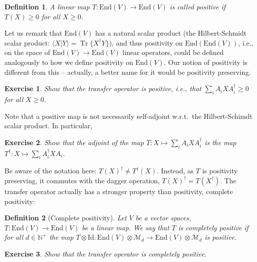 \documentclass{article}
\newtheorem{definition}{Definition}
\newtheorem{exercise}{Exercise}
\newcommand{\tr}{\operatorname{Tr}}
\newcommand{\id}{\mathrm{Id}}
\newcommand{\End}{\mathrm{End}}
\newcommand{\scalprod}[2]{\langle #1 \vert #2 \rangle}
\begin{document}
\begin{definition}  
   A linear map $T:\End(V)\to \End(V)$ is called positive if $T(X)\geq 0$ for all $X\geq 0$.  
\end{definition}
Let us remark that $\End(V)$ has a natural scalar product (the Hilbert-Schmidt scalar product: $\scalprod{X}{Y} = \tr\{X^\dagger Y\}$), and thus positivity on $\End(\End(V))$, i.e., on the space of $\End(V)\to \End(V)$ linear operators, could be defined analogously to how we define positivity on $\End(V)$. Our notion of positivity is different from this -- actually, a better name for it would be positivity preserving. 
\begin{exercise}
  Show that the transfer operator is positive, i.e., that $\sum_i A_i X A_i^\dagger\geq 0$ for all $X\geq 0$. 
\end{exercise}
Note that a positive map is not necessarily self-adjoint w.r.t.\ the Hilbert-Schimdt scalar product. In particular,
\begin{exercise}
  Show that the adjoint of the map $T:X\mapsto \sum_i A_i X A_i^\dagger$ is the map $T^\dagger:X\mapsto \sum_i A_i^\dagger X A_i$.
\end{exercise}
Be aware of the notation here: $T(X)^\dagger \neq T^\dagger(X)$. Instead, as $T$ is positivity preserving, it commutes with the dagger operation, $T(X)^\dagger = T(X^\dagger)$. The transfer operator actually has a stronger property than positivity, complete positivity:
\begin{definition}[Complete positivity]
  Let $V$ be a vector spaces, $T:\End(V) \to \End(V)$ be a linear map. We say that $T$ is completely positive if for all $d\in\mathbb{N}^+$ the map $T\otimes \id: \End(V)\otimes \mathcal{M}_d \to \End(V)\otimes \mathcal{M}_d $ is positive. 
\end{definition}
\begin{exercise}
  Show that the transfer operator is completely positive. 
\end{exercise}
\end{document}
